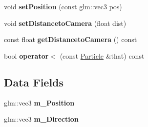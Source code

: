 \begin{DoxyCompactItemize}
\item 
void {\bfseries set\+Position} (const glm\+::vec3 pos)\hypertarget{class_particle_a1fdd1cf794426d3a5cbaa1efeb6e5cdf}{}\label{class_particle_a1fdd1cf794426d3a5cbaa1efeb6e5cdf}

\item 
void {\bfseries set\+Distanceto\+Camera} (float dist)\hypertarget{class_particle_a3ae8f7c1568049d5549dfb96c785164e}{}\label{class_particle_a3ae8f7c1568049d5549dfb96c785164e}

\item 
const float {\bfseries get\+Distanceto\+Camera} () const \hypertarget{class_particle_a508642571a5946f860ac62d9883637c3}{}\label{class_particle_a508642571a5946f860ac62d9883637c3}

\item 
bool {\bfseries operator$<$} (const \hyperlink{class_particle}{Particle} \&that) const \hypertarget{class_particle_a1ea5d4a5c5803cf5597ca671f37c97dd}{}\label{class_particle_a1ea5d4a5c5803cf5597ca671f37c97dd}

\end{DoxyCompactItemize}
\subsection*{Data Fields}
\begin{DoxyCompactItemize}
\item 
glm\+::vec3 {\bfseries m\+\_\+\+Position}\hypertarget{class_particle_a05bdcd46ec00aec441b72c5f1fe99c9a}{}\label{class_particle_a05bdcd46ec00aec441b72c5f1fe99c9a}

\item 
glm\+::vec3 {\bfseries m\+\_\+\+Direction}\hypertarget{class_particle_a1ad7f1a189d1a1f3a89a3f30a6cb7789}{}\label{class_particle_a1ad7f1a189d1a1f3a89a3f30a6cb7789}

\end{DoxyCompactItemize}
